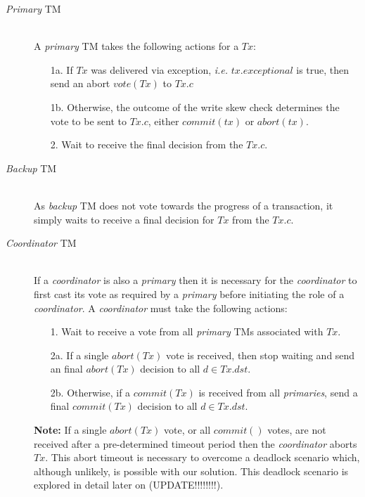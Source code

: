     \begin{description}
        \item[\emph{Primary} TM] \hfill \\
        A \emph{primary} TM takes the following actions for a $Tx$:
            \begin{enumerate}
                \item[1a.]    If $Tx$ was delivered via exception, \emph{i.e.} $tx.exceptional$ is true, then send an abort $vote(Tx)$ to $Tx.c$
                
                \item[1b.]    Otherwise, the outcome of the write skew check determines the vote to be sent to $Tx.c$, either $commit(tx)$ or $abort(tx)$.  
                
                \item[2.]    Wait to receive the final decision from the $Tx.c$.  
            \end{enumerate}
            
        \item[\emph{Backup} TM] \hfill \\
         As \emph{backup} TM does not vote towards the progress of a transaction, it simply waits to receive a final decision for $Tx$ from the $Tx.c$.  
        
        \item[\emph{Coordinator} TM] \hfill \\
        If a \emph{coordinator} is also a \emph{primary} then it is necessary for the \emph{coordinator} to first cast its vote as required by a \emph{primary} before initiating the role of a \emph{coordinator}.  A \emph{coordinator} must take the following actions:
        
        \begin{enumerate}
            \item[1.]    Wait to receive a vote from all \emph{primary} TMs associated with $Tx$.  
            
            \item[2a.]    If a single $abort(Tx)$ vote is received, then stop waiting and send an final $abort(Tx)$ decision to all $d \in Tx.dst$.  
            
            \item[2b.]    Otherwise, if a $commit(Tx)$ is received from all \emph{primaries}, send a final $commit(Tx)$ decision to all $d \in Tx.dst$.  
        \end{enumerate}
        
        \textbf{Note:} If a single $abort(Tx)$ vote, or all $commit()$ votes, are not received after a pre-determined timeout period then the \emph{coordinator} aborts $Tx$.  This abort timeout is necessary to overcome a deadlock scenario which, although unlikely, is possible with our solution.  This deadlock scenario is explored in detail later on (UPDATE!!!!!!!!).  
    \end{description}              
    
